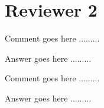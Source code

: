 %
%
\section*{Reviewer 2}
%
%
\begin{ReviewerComment}{2}
Comment goes here .........\end{ReviewerComment}
\begin{Answer}
Answer goes here .........
\end{Answer}


\begin{ReviewerComment}{2}
Comment goes here .........\end{ReviewerComment}
\begin{Answer}
Answer goes here .........
\end{Answer}